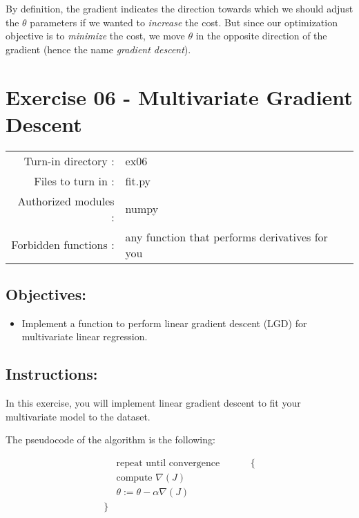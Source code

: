 \documentclass[]{article}
\providecommand{\tightlist}{%
  \setlength{\itemsep}{0pt}\setlength{\parskip}{0pt}}
\begin{document}
By definition, the gradient indicates the direction towards which we
should adjust the \(\theta\) parameters if we wanted to \emph{increase}
the cost. But since our optimization objective is to \emph{minimize} the
cost, we move \(\theta\) in the opposite direction of the gradient
(hence the name \emph{gradient descent}). \clearpage

\hypertarget{exercise-06---multivariate-gradient-descent-1}{%
\section{Exercise 06 - Multivariate Gradient
Descent}\label{exercise-06---multivariate-gradient-descent-1}}

\begin{longtable}[]{@{}rl@{}}
\toprule
\endhead
Turn-in directory : & ex06\tabularnewline
Files to turn in : & fit.py\tabularnewline
Authorized modules : & numpy\tabularnewline
Forbidden functions : & any function that performs derivatives for
you\tabularnewline
\bottomrule
\end{longtable}

\hypertarget{objectives-4}{%
\subsection{Objectives:}\label{objectives-4}}

\begin{itemize}
\tightlist
\item
  Implement a function to perform linear gradient descent (LGD) for
  multivariate linear regression.
\end{itemize}

\hypertarget{instructions-5}{%
\subsection{Instructions:}\label{instructions-5}}

In this exercise, you will implement linear gradient descent to fit your
multivariate model to the dataset.

The pseudocode of the algorithm is the following:

\large

\[
\begin{matrix}
    &   \text{repeat until convergence} \hspace{1cm} &  \{  \\
    &   \text{compute } \nabla{(J)}  \\
    &   \theta := \theta - \alpha \nabla(J)                 \\ 
\} 
\end{matrix}
\] \normalsize
\end{document}
